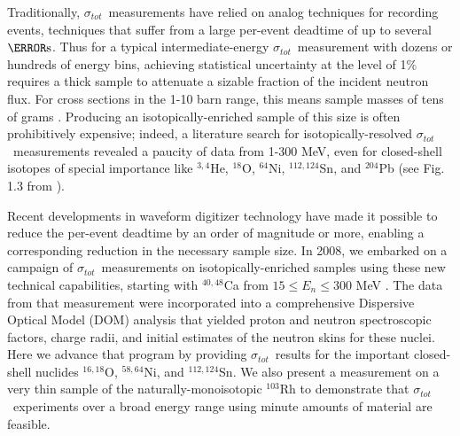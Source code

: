 \documentclass[twocolumn,secnumarabic,amssymb, nobibnotes, aps, prl,
superscriptaddress, nobalancelastpage]{revtex4}
\newcommand{\tot}{\ensuremath{\sigma_{tot}}}
\newcommand{\oEight}{\ensuremath{^{18}}O}
\newcommand{\niFour}{\ensuremath{^{64}}N\lowercase{i}}
\newcommand{\snTwelveFour}{\ensuremath{^{112,124}}S\lowercase{n}}
\begin{document}
Traditionally, \tot\ measurements have relied on analog techniques for recording
events, techniques that suffer from a large per-event deadtime of
up to several $\micro\second$. Thus for a typical intermediate-energy \tot\ measurement
with dozens or hundreds of energy bins, achieving statistical uncertainty at the
level of 1\% requires a thick sample to attenuate a sizable fraction of the
incident neutron flux. For cross sections in the 1-10 barn range, this means
sample masses of tens of grams \cite{Finlay1993, Abfalterer2001}.
Producing an isotopically-enriched sample of this size is often
prohibitively expensive; indeed, a literature search for isotopically-resolved
\tot\ measurements revealed a paucity of data from 1-300 MeV, even for
closed-shell isotopes of special importance like $^{3,4}$He, \oEight, \niFour,
\snTwelveFour, and $^{204}$Pb (see Fig. 1.3 from \cite{IsotopicCrossSectionTable}).

Recent developments in waveform digitizer technology have made it
possible to reduce the per-event deadtime by an order of magnitude or more,
enabling a corresponding reduction in the necessary sample size. In 2008, we
embarked on a campaign of \tot\ measurements on isotopically-enriched samples
using these new technical capabilities,
starting with $^{40,48}$Ca from $15 \leq E_{n} \leq 300$ MeV \cite{Shane2010}.
The data from that measurement were incorporated into a comprehensive
Dispersive Optical Model (DOM) analysis \cite{Mueller2011, Mahzoon2014,
MahzoonPhDThesis} that yielded proton and neutron spectroscopic factors, charge
radii, and initial estimates of the neutron skins \cite{Mahzoon2017}
for these nuclei.
Here we advance that program by providing \tot\ results for
the important closed-shell nuclides
$^{16,18}$O, $^{58,64}$Ni, and $^{112,124}$Sn. We also present a measurement
on a very thin sample of the naturally-monoisotopic $^{103}$Rh to demonstrate that
\tot\ experiments over a broad energy range using minute amounts of material are feasible.
\end{document}
